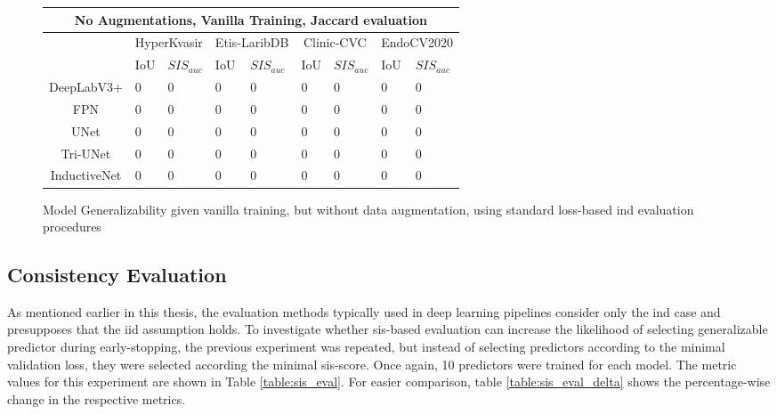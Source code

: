             \begin{figure}[h]
            \centering
            \begin{tabularx}{\linewidth}{XXXXXXXXXX}
            \toprule
            \multicolumn{10}{c}{\textbf{No Augmentations, Vanilla Training, Jaccard evaluation}}\\
            \toprule
            &&\multicolumn{2}{c}{HyperKvasir} &
            \multicolumn{2}{c}{Etis-LaribDB} & 
            \multicolumn{2}{c}{Clinic-CVC} & 
            \multicolumn{2}{c}{EndoCV2020}\\
            \cmidrule(lr){3-4}\cmidrule(lr){5-6}            \cmidrule(lr){7-8}\cmidrule(lr){9-10}
            && IoU & \(SIS_{auc}\) & IoU & \(SIS_{auc}\) &IoU & \(SIS_{auc}\) & IoU & \(SIS_{auc}\) \\  
            \midrule
            \multicolumn{2}{c}{DeepLabV3+} & 0 & 0 & 0 & 0 & 0 & 0 & 0 & 0 \\
            \multicolumn{2}{c}{FPN} & 0 & 0 & 0 & 0 & 0 & 0 & 0 & 0 \\
            \multicolumn{2}{c}{UNet} & 0 & 0 & 0 & 0 & 0 & 0 & 0 & 0 \\
            \multicolumn{2}{c}{Tri-UNet} & 0 & 0 & 0 & 0 & 0 & 0 & 0 & 0 \\
            \multicolumn{2}{c}{InductiveNet} & 0 & 0 & 0 & 0 & 0 & 0 & 0 & 0 \\
            \bottomrule
        \end{tabularx}
            \caption{Model Generalizability given vanilla training, but without data augmentation, using standard loss-based \gls{ind} evaluation procedures}
            \label{table:vanilla}
        \end{figure}
        
        
    \subsection{Consistency Evaluation}
    As mentioned earlier in this thesis, the evaluation methods typically used in deep learning pipelines consider only the \gls{ind} case and presupposes that the \gls{iid} assumption holds. To investigate whether \gls{sis}-based evaluation can increase the likelihood of selecting generalizable predictor during early-stopping, the previous experiment was repeated, but instead of selecting predictors according to the minimal validation loss, they were selected according the minimal \gls{sis}-score. Once again, 10 predictors were trained for each model. The metric values for this experiment are shown in Table \ref{table:sis_eval}. For easier comparison, table \ref{table:sis_eval_delta} shows the percentage-wise change in the respective metrics. 
    
